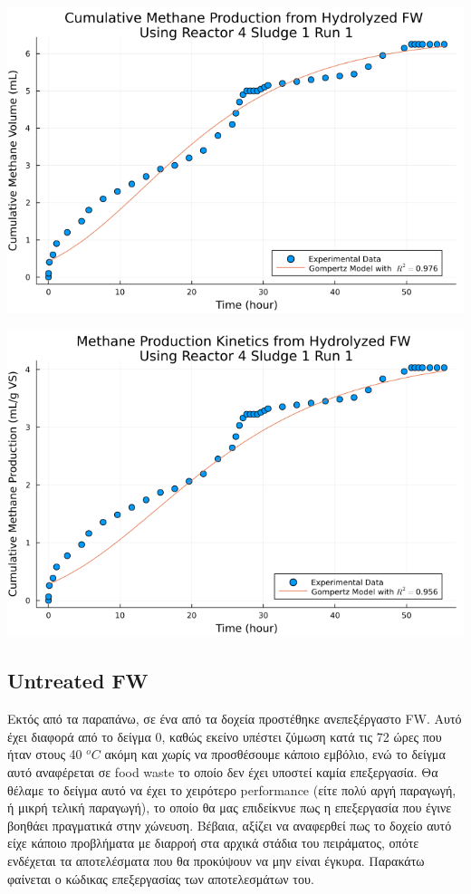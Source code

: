 \documentclass[11pt]{article}
\begin{document}
\begin{center}
\includegraphics[width=.9\linewidth]{../plots/BMPs/Hydrolyzed FW/methane_kinetics_hydrolysate_4_s1_r1_hour.png}
\end{center}

\begin{center}
\includegraphics[width=.9\linewidth]{../plots/BMPs/Hydrolyzed FW/specific_methane_kinetics_hydrolysate_4_s1_r1_hour.png}
\end{center}

\subsection{Untreated FW}
\label{sec:org9939569}
Εκτός από τα παραπάνω, σε ένα από τα δοχεία προστέθηκε ανεπεξέργαστο FW. Αυτό έχει διαφορά από το δείγμα 0, καθώς εκείνο υπέστει ζύμωση κατά τις 72 ώρες που ήταν στους 40 \(^oC\) ακόμη και χωρίς να προσθέσουμε κάποιο εμβόλιο, ενώ το δείγμα αυτό αναφέρεται σε food waste το οποίο δεν έχει υποστεί καμία επεξεργασία. Θα θέλαμε το δείγμα αυτό να έχει το χειρότερο performance (είτε πολύ αργή παραγωγή, ή μικρή τελική παραγωγή), το οποίο θα μας επιδείκνυε πως η επεξεργασία που έγινε βοηθάει πραγματικά στην χώνευση. Βέβαια, αξίζει να αναφερθεί πως το δοχείο αυτό είχε κάποιο προβλήματα με διαρροή στα αρχικά στάδια του πειράματος, οπότε ενδέχεται τα αποτελέσματα που θα προκύψουν να μην είναι έγκυρα. Παρακάτω φαίνεται ο κώδικας επεξεργασίας των αποτελεσμάτων του.
\end{document}
